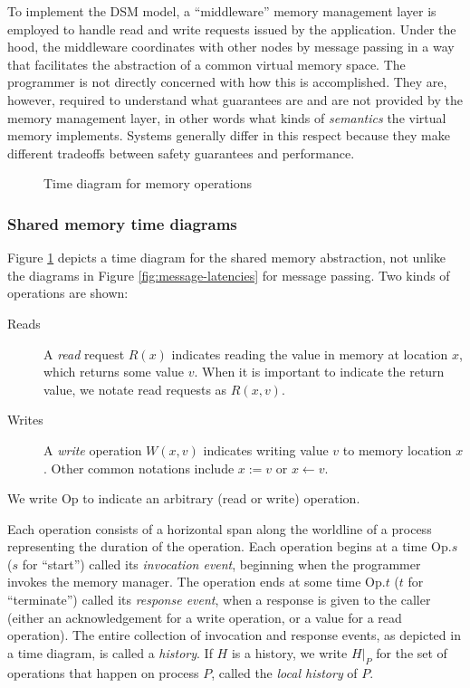 \documentclass[]             %
{NASA}                       %
\theoremstyle{definition}
\begin{document}
To implement the DSM model, a ``middleware'' memory management layer
is employed to handle read and write requests issued by the
application. Under the hood, the middleware coordinates with other
nodes by message passing in a way that facilitates the abstraction of
a common virtual memory space. The programmer is not directly
concerned with how this is accomplished. They are, however, required
to understand what guarantees are and are not provided by the memory
management layer, in other words what kinds of \emph{semantics} the
virtual memory implements. Systems generally differ in this respect
because they make different tradeoffs between safety guarantees and
performance.

\begin{figure}
    \centering
    
    \caption{Time diagram for memory operations}
    \label{fig:smEx1}
\end{figure}

\subsubsection{Shared memory time diagrams}
\newcommand{\Op}{\mathrm{Op}}

Figure \ref{fig:smEx1} depicts a time diagram for the shared memory
abstraction, not unlike the diagrams in Figure
\ref{fig:message-latencies} for message passing. Two kinds of
operations are shown:
\begin{description}
\item[Reads] A \emph{read} request $R(x)$ indicates reading the value
  in memory at location $x$, which returns some value $v$. When it is
  important to indicate the return value, we notate read requests as
  $R(x, v)$.
\item[Writes] A \emph{write} operation $W(x, v)$ indicates writing
  value $v$ to memory location $x$. Other common notations include
  $x := v$ or $x \leftarrow v$.
\end{description}
We write $\Op$ to indicate an arbitrary (read or write)
operation.

Each operation consists of a horizontal span along the worldline of a
process representing the duration of the operation. Each operation
begins at a time $\Op.s$ ($s$ for ``start'') called its
\emph{invocation event}, beginning when the programmer invokes the
memory manager. The operation ends at some time $\Op.t$ ($t$ for
``terminate'') called its \emph{response event}, when a response is
given to the caller (either an acknowledgement for a write operation,
or a value for a read operation). The entire collection of invocation
and response events, as depicted in a time diagram, is called a
\emph{history}. If $H$ is a history, we write $H|_P$ for the set of
operations that happen on process $P$, called the \emph{local history}
of $P$.
\end{document}
